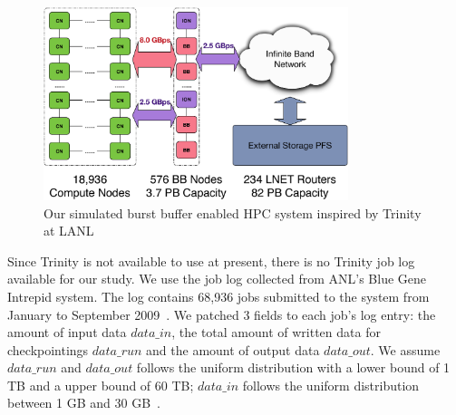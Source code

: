 \begin{figure}[htp]
        \centering
        \includegraphics[width=3.5in]{BBArchitecturewithBandwidth}
        \caption{Our simulated burst buffer enabled HPC system inspired by Trinity at LANL}
        \label{Fig:BBArchitecture}
\end{figure}



Since Trinity is not available to use at present, 
there is no Trinity job log available for our study.
We use the job log collected from ANL's Blue Gene Intrepid system. The log contains 68,936 jobs
submitted to the system from January to September 2009~\cite{Tang:IPDPS:2010}.
We patched 3 fields to each job's log entry: the amount of input data $data\_in$,
the total amount of written data for checkpointings $data\_run$
and the amount of output data $data\_out$.
We assume $data\_run$ and $data\_out$ follows the uniform distribution with a
lower bound of 1 TB and a upper bound of 60 TB;
$data\_in$ follows the uniform distribution between 1 GB and 30 GB~\cite{Liu:MSST:2012}.




